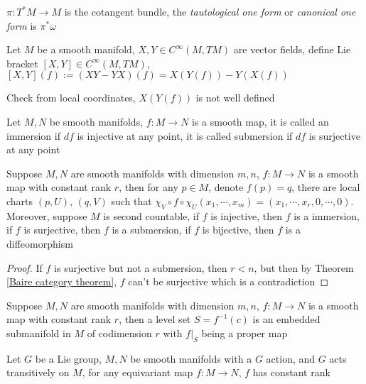 \documentclass[main]{subfiles}
\begin{document}
\begin{definition}
$\pi:T^*M\to M$ is the cotangent bundle, the \textit{tautological one form} or \textit{canonical one form} is $\pi^*\omega$
\end{definition}

\begin{definition}
Let $M$ be a smooth manifold, $X,Y\in C^\infty(M,TM)$ are vector fields, define Lie bracket $[X,Y]\in C^\infty(M,TM)$, $[X,Y](f):=(XY-YX)(f)=X(Y(f))-Y(X(f))$
\end{definition}

\begin{remark}
Check from local coordinates, $X(Y(f))$ is not well defined
\end{remark}

\begin{definition}
Let $M,N$ be smooth manifolds, $f:M\to N$ is a smooth map, it is called an immersion if $df$ is injective at any point, it is called submersion if $df$ is surjective at any point
\end{definition}

\begin{theorem}\label{Constant rank mapping theorem}
Suppose $M,N$ are smooth manifolds with dimension $m,n$, $f:M\to N$ is a smooth map with constant rank $r$, then for any $p\in M$, denote $f(p)=q$, there are local charts $(p,U)$, $(q,V)$ such that $\chi_V\circ f\circ\chi_U(x_1,\cdots,x_m)=(x_1,\cdots,x_r,0,\cdots,0)$. Moreover, suppose $M$ is second countable, if $f$ is injective, then $f$ is a immersion, if $f$ is surjective, then $f$ is a submersion, if $f$ is bijective, then $f$ is a diffeomorphism
\end{theorem}

\begin{proof}
If $f$ is surjective but not a submersion, then $r<n$, but then by Theorem \ref{Baire category theorem}, $f$ can't be surjective which is a contradiction
\end{proof}

\begin{theorem}\label{Constant rank level set theorem}
Suppose $M,N$ are smooth manifolds with dimension $m,n$, $f:M\to N$ is a smooth map with constant rank $r$, then a level set $S=f^{-1}(c)$ is an embedded submanifold in $M$ of codimension $r$ with $f|_S$ being a proper map
\end{theorem}

\begin{proposition}
Let $G$ be a Lie group, $M,N$ be smooth manifolds with a $G$ action, and $G$ acts transitively on $M$, for any equivariant map $f:M\to N$, $f$ has constant rank
\end{proposition}
\end{document}
